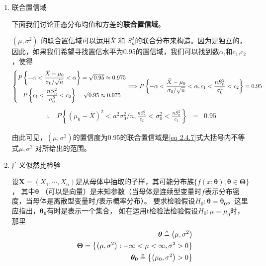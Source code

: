 \begin{enumerate}[1)]
		\item 联合置信域
			
			下面我们讨论正态分布均值和方差的{\bf 联合置信域}。
			
			$ \left(\mu, \sigma^{2}\right) $ 的联合置信域可以运用$ \bar{X} \text { 和 } S_{n}^{2} $的联合分布来构造。因为是独立的，因此，如果我们希望寻找置信水平为0.95的置信域，我们可以找到数$ \alpha $,和$ c_1 $,$ c_2 $，使得
			$$ \left\{\begin{matrix}
				P\left\{-\alpha <\dfrac{\bar{X}-\mu_{0}}{\sigma_{0} / \sqrt{n}}<\alpha \right\} =\sqrt{0.95} \approx 0.975 \vspace{0.5em} \\
				P\left\{c_{1}<\dfrac{n S_{n}^{2}}{\sigma_{0}^{2}}<c_{2}\right\}=\sqrt{0.95} \approx 0.975
			\end{matrix}\right.  \Longrightarrow 
			P\left\{-\alpha <\dfrac{\bar{X}-\mu_{0}}{\sigma_{0} / \sqrt{n}}<\alpha , c_{1}<\frac{n S_{n}^{2}}{\sigma_{0}^{2}}<c_{2}\right\}=0.95 $$
			\begin{eqnarray}
				\therefore \quad P\left\{\left(\mu_{0}-\bar{X}\right)^{2}<a^{2} \sigma_{0}^{2} / n, \frac{n S_{n}^{2}}{c_{2}}<\sigma_{0}^{2}<\frac{n S_{n}^{2}}{c_{1}}\right\} & = & 0.95
				\label{eq 2.4.7}
			\end{eqnarray}
			
			由此可见，$ \left(\mu, \sigma^{2}\right) $的置信度为0.95的联合置信域是\eqref{eq 2.4.7}式大括号内不等式$ \mu, \sigma^{2} $ 对所给出的范围。
		\item 广义似然比检验
		
        设$ \boldsymbol{X}=\left(X_{1}, \cdots, X_{n}\right) $是从母体中抽取的子样，其可能分布族$ \{f(x ; \boldsymbol{\theta}), \boldsymbol{\theta \in \Theta} \} $，
        其中$ \boldsymbol{\theta} $ （可以是向量）是未知参数（当母体是连续型变量时$ f $表示分布密度，当母体是离散型变量时$ f $表示概率分布）。
        要求检验假设$ H_0 : \boldsymbol{ \theta=\theta_0} $。这里应指出，$ \boldsymbol{\theta_0 }$有时是表示一个集合，
		如在运用t检验法检验假设$ H_0:\mu=\mu_0 $时，那里
		\begin{eqnarray}
		& & \boldsymbol{\theta}    \triangleq\left(\mu, \sigma^{2}\right) \notag  \\
		& & \boldsymbol{\Theta}  =  \left\{\left(\mu, \sigma^{2}\right):-\infty<\mu<\infty, \sigma^{2}>0\right\} \notag\\
		& & \boldsymbol{\theta_{0} }   \triangleq \left\{\left(\mu_{0}, \sigma^{2}\right)>0\right\} \notag
		\end{eqnarray}
		

\end{enumerate}
